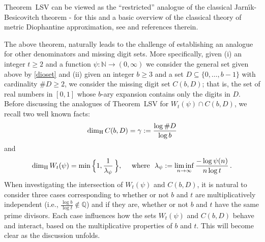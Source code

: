 \documentclass[12pt]{article}
\theoremstyle{definition}
\theoremstyle{remark}
\begin{document}
\noindent Theorem~LSV can be viewed as the ``restricted'' analogue of the classical Jarn{\'\i}k-Besicovitch theorem - for this and a basic overview of  the classical theory of metric Diophantine approximation, see   \cite{MR3618787} and references therein.  





The above theorem, naturally leads to the challenge of establishing an analogue for other denominators and missing digit sets. More specifically,  given (i) an integer $t\geq2$ and a function  $\psi:\mathbb{N}\to(0,\infty)$ we consider the general set given above by  \eqref{dioset} and (ii) given  an integer $b\geq3$ and a set $D \subseteq \{0,\ldots,b-1\}$ with cardinality   $\# D \ge 2$, we consider the missing digit set $C(b,D)$; that is,  the set of real numbers in $[0,1]$ whose $b$-ary expansion contains only the digits in $D$.  Before discussing the analogues of Theorem~LSV for $W_{t}(\psi)\cap C(b,D)$, we recall two well known facts:
\begin{equation}  \label{dim-cantorSV}
\dim_{\rm H} C(b,D) =  \gamma:=\frac{\log \#D}{\log b}
\end{equation}
and
\begin{equation}  \label{dim-order}
\dim_{\rm H}W_{t}(\psi) =   \min \Big\{  1, \frac{1}{\lambda_\psi}  \, \Big\},  \ \ \ \  {\rm where }  \ \   \lambda_\psi:= \liminf_{n \to \infty}  \frac{- \log \psi(n)}{n \log t }  \, .
\end{equation}
\noindent When investigating the intersection of $W_{t}(\psi)$ and $ C(b,D)$,  it is natural to consider three cases corresponding to whether or not $b$ and $t$ are multiplicatively independent (i.e., $\frac{\log b}{\log t}\notin\mathbb{Q}$) and if they are,  whether or not $b$ and $t$  have the same prime divisors.  Each case influences how the sets  $W_{t}(\psi)$ and $ C(b,D)$  behave and interact, based on the multiplicative properties of $b$ and $t$. This will become clear as the discussion unfolds.
\end{document}
